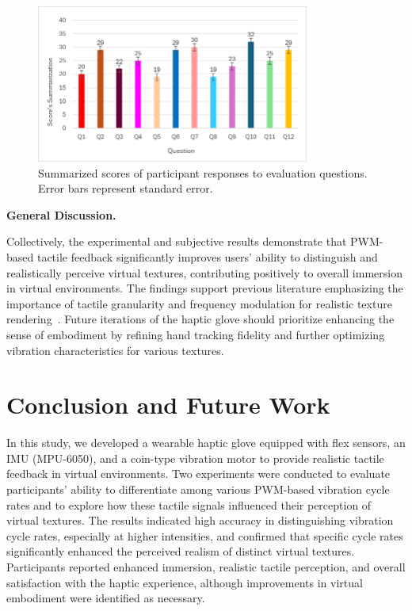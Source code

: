 \documentclass[graybox]{svmult}
\begin{document}
\begin{figure}\centering
	\includegraphics[width=0.8\textwidth]{figure/quetion_result.png}%
	\caption{Summarized scores of participant responses to evaluation questions. Error bars represent standard error.}\label{fig:questionnaire_results}
\end{figure}

\textbf{General Discussion.}  

Collectively, the experimental and subjective results demonstrate that PWM-based tactile feedback significantly improves users' ability to distinguish and realistically perceive virtual textures, contributing positively to overall immersion in virtual environments. The findings support previous literature emphasizing the importance of tactile granularity and frequency modulation for realistic texture rendering~\cite{strohmeier2017generating,bach2023enhanced}. Future iterations of the haptic glove should prioritize enhancing the sense of embodiment by refining hand tracking fidelity and further optimizing vibration characteristics for various textures.


\section{Conclusion and Future Work}

In this study, we developed a wearable haptic glove equipped with flex sensors, an IMU (MPU-6050), and a coin-type vibration motor to provide realistic tactile feedback in virtual environments. Two experiments were conducted to evaluate participants' ability to differentiate among various PWM-based vibration cycle rates and to explore how these tactile signals influenced their perception of virtual textures. The results indicated high accuracy in distinguishing vibration cycle rates, especially at higher intensities, and confirmed that specific cycle rates significantly enhanced the perceived realism of distinct virtual textures. Participants reported enhanced immersion, realistic tactile perception, and overall satisfaction with the haptic experience, although improvements in virtual embodiment were identified as necessary.
\end{document}
